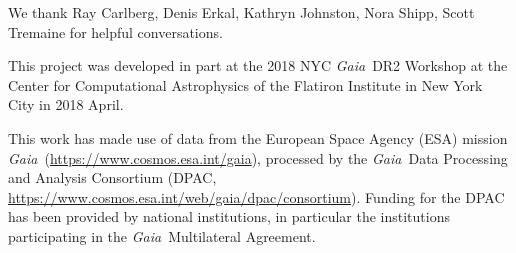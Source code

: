 \documentclass[twocolumn]{aastex62}
\newcommand{\acronym}[1]{{\small{#1}}}
\newcommand{\gaia}{\textsl{Gaia}}
\begin{document}
\vspace{0.5cm}
\acknowledgements
We thank Ray Carlberg, Denis Erkal, Kathryn Johnston, Nora Shipp, Scott Tremaine for helpful conversations.

This project was developed in part at the 2018 \acronym{NYC} \gaia\ \acronym{DR2} Workshop at the Center for Computational Astrophysics of the Flatiron Institute in New York City in 2018 April.

This work has made use of data from the European Space Agency (\acronym{ESA}) mission \gaia\ (\url{https://www.cosmos.esa.int/gaia}), processed by the \gaia\ Data Processing and Analysis Consortium (\acronym{DPAC}, \url{https://www.cosmos.esa.int/web/gaia/dpac/consortium}). Funding for the \acronym{DPAC} has been provided by national institutions, in particular the institutions participating in the \gaia\ Multilateral Agreement.

%
%
\end{document}

